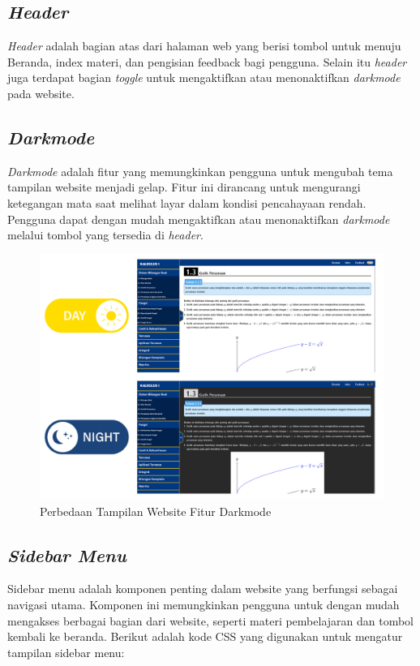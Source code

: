 \documentclass{file/KP-ITS}
\theoremstyle{definition}
\theoremstyle{definition}
\theoremstyle{plain}
\begin{document}
\subsection{\textit{Header}}
\textit{Header} adalah bagian atas dari halaman web yang berisi tombol untuk menuju Beranda, index materi, dan pengisian feedback bagi pengguna. Selain itu \textit{header} juga terdapat bagian \textit{toggle} untuk mengaktifkan atau menonaktifkan \textit{darkmode} pada website.

\subsection{\textit{Darkmode}}
\textit{Darkmode} adalah fitur yang memungkinkan pengguna untuk mengubah tema tampilan website menjadi gelap. Fitur ini dirancang untuk mengurangi ketegangan mata saat melihat layar dalam kondisi pencahayaan rendah. Pengguna dapat dengan mudah mengaktifkan atau menonaktifkan \textit{darkmode} melalui tombol yang tersedia di \textit{header}.
\begin{figure}[h!]
  \centering
  \includegraphics[width=\textwidth]{foto/LightDarkMode.png}
  \caption{Perbedaan Tampilan Website Fitur Darkmode}
\end{figure}
\subsection{\textit{Sidebar Menu}}
Sidebar menu adalah komponen penting dalam website yang berfungsi sebagai navigasi utama. Komponen ini memungkinkan pengguna untuk dengan mudah mengakses berbagai bagian dari website, seperti materi pembelajaran dan tombol kembali ke beranda. Berikut adalah kode CSS yang digunakan untuk mengatur tampilan sidebar menu:
\end{document}

